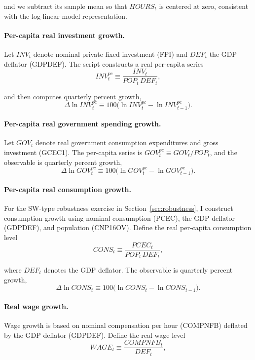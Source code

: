 and we subtract its sample mean so that $HOURS_t$ is centered at zero, consistent with the log-linear model representation.

\paragraph{Per-capita real investment growth.}
Let $INV_t$ denote nominal private fixed investment (FPI) and $DEF_t$ the GDP deflator (GDPDEF). The script constructs a real per-capita series
\begin{equation}
	INV^{pc}_t \equiv \frac{INV_t}{POP_t\,DEF_t},
\end{equation}

and then computes quarterly percent growth,
\begin{equation}
	\Delta \ln INV^{pc}_t \equiv 100\big(\ln INV^{pc}_t - \ln INV^{pc}_{t-1}\big).
\end{equation}

\paragraph{Per-capita real government spending growth.}
Let $GOV_t$ denote real government consumption expenditures and gross investment (GCEC1). The per-capita series is $GOV^{pc}_t\equiv GOV_t/POP_t$, and the observable is quarterly percent growth,
\begin{equation}
	\Delta \ln GOV^{pc}_t \equiv 100\big(\ln GOV^{pc}_t - \ln GOV^{pc}_{t-1}\big).
\end{equation}

\paragraph{Per-capita real consumption growth.}
For the SW-type robustness exercise in Section~\ref{sec:robustness}, I construct consumption growth using nominal consumption (PCEC), the GDP deflator (GDPDEF), and population (CNP16OV). Define the real per-capita consumption level
\begin{equation}
	CONS_t \equiv \frac{PCEC_t}{POP_t\,DEF_t},
\end{equation}

where $DEF_t$ denotes the GDP deflator. The observable is quarterly percent growth,
\begin{equation}
	\Delta \ln CONS_t \equiv 100\big(\ln CONS_t - \ln CONS_{t-1}\big).
\end{equation}

\paragraph{Real wage growth.}
Wage growth is based on nominal compensation per hour (COMPNFB) deflated by the GDP deflator (GDPDEF). Define the real wage level
\begin{equation}
	WAGE_t \equiv \frac{COMPNFB_t}{DEF_t},
\end{equation}

